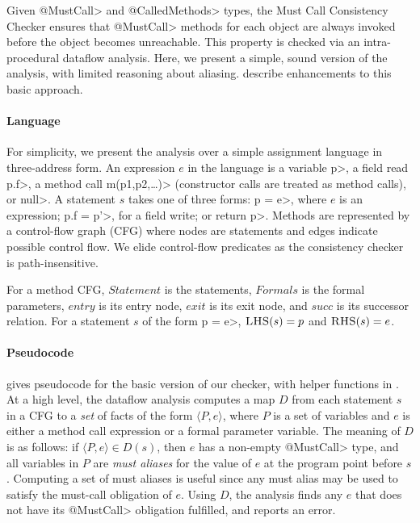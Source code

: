 Given \<@MustCall> and \<@CalledMethods> types, the Must
Call Consistency Checker ensures that \<@MustCall> methods for each object
are always invoked before the object becomes unreachable.  This property is
checked via an intra-procedural dataflow analysis.  Here, we present
a simple, sound version of the analysis, with limited reasoning about aliasing.
describe enhancements to this basic approach.

\paragraph{Language} For simplicity, we present the analysis over a simple
assignment language in three-address form.  An expression $e$ in the language is
a variable \<p>, a field read \<p.f>, a method call \<m(p1,p2,\ldots)> (constructor
calls are treated as method calls), or \<null>.  A statement $s$ takes one of three forms:
\<p = e>, where $e$ is an expression; \<p.f = p'>, for a field write; or
\<return p>.  Methods are represented by a control-flow graph (CFG) where nodes
are statements and edges indicate possible control flow.  We elide control-flow
predicates as the consistency checker is path-insensitive.


For a method CFG, $\mathit{Statement}$ is the statements,
$\mathit{Formals}$ is the formal parameters,
$\mathit{entry}$ is its entry node,
$\mathit{exit}$ is its exit node, and
$\mathit{succ}$ is its successor relation.
For a statement
$s$ of the form \<p = e>, $\textsc{LHS}(s) = p$ and $\textsc{RHS}(s) = e$.

\paragraph{Pseudocode}  gives pseudocode for the
basic version of our checker, with helper functions in .  At a
high level, the dataflow analysis computes a map $D$ from each statement $s$ in
a CFG to a \emph{set} of facts of the form $\langle P, e \rangle$, where $P$ is
a set of variables and $e$ is either a method call expression or a formal
parameter variable.  The meaning of $D$ is as follows: if $\langle P, e \rangle
\in D(s)$, then $e$ has a non-empty \<@MustCall> type, and all variables in $P$
are \emph{must aliases} for the value of $e$ at the program point before $s$.
Computing a set of must aliases is useful since any must alias may be used to
satisfy the must-call obligation of $e$.  Using $D$, the analysis finds any $e$
that does not have its \<@MustCall> obligation fulfilled, and reports an error.

